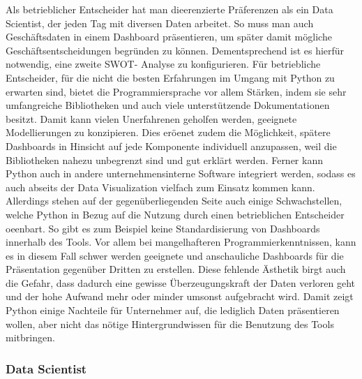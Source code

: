 \documentclass[12pt]{article}
\begin{document}
	Als betrieblicher Entscheider hat man dieerenzierte Präferenzen als ein Data Scientist,
	der jeden Tag mit diversen Daten arbeitet. So muss man auch Geschäftsdaten in einem
	Dashboard präsentieren, um später damit mögliche Geschäftsentscheidungen
	begründen zu können. Dementsprechend ist es hierfür notwendig, eine zweite SWOT-
	Analyse zu konfigurieren.
	Für betriebliche Entscheider, für die nicht die besten Erfahrungen im Umgang mit Python
	zu erwarten sind, bietet die Programmiersprache vor allem Stärken, indem sie sehr
	umfangreiche Bibliotheken und auch viele unterstützende Dokumentationen besitzt.
	Damit kann vielen Unerfahrenen geholfen werden, geeignete Modellierungen zu
	konzipieren. Dies eröenet zudem die Möglichkeit, spätere Dashboards in Hinsicht auf
	jede Komponente individuell anzupassen, weil die Bibliotheken nahezu unbegrenzt sind
	und gut erklärt werden.
	Ferner kann Python auch in andere unternehmensinterne Software integriert werden,
	sodass es auch abseits der Data Visualization vielfach zum Einsatz kommen kann.
	Allerdings stehen auf der gegenüberliegenden Seite auch einige Schwachstellen, welche
	Python in Bezug auf die Nutzung durch einen betrieblichen Entscheider oeenbart.
	So gibt es zum Beispiel keine Standardisierung von Dashboards innerhalb des Tools. Vor
	allem bei mangelhafteren Programmierkenntnissen, kann es in diesem Fall schwer
	werden geeignete und anschauliche Dashboards für die Präsentation gegenüber Dritten
	zu erstellen. Diese fehlende Ästhetik birgt auch die Gefahr, dass dadurch eine gewisse
	Überzeugungskraft der Daten verloren geht und der hohe Aufwand mehr oder minder
	umsonst aufgebracht wird.
	Damit zeigt Python einige Nachteile für Unternehmer auf, die lediglich Daten
	präsentieren wollen, aber nicht das nötige Hintergrundwissen für die Benutzung des
	Tools mitbringen.
	
	\subsubsection{Data Scientist}
	
\end{document}
